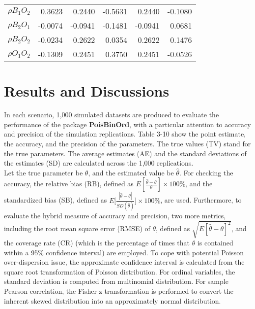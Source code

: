 \documentclass[letterpaper]{article}
\begin{document}
\begin{table}[h]
\begin{tabular}{crrrrr}
$\rho{B_1O_2}$ & 0.3623                  & 0.2440                  & -0.5631                  & 0.2440                    & -0.1080                                    \\
$\rho{B_2O_1}$ & -0.0074                 & -0.0941                 & -0.1481                  & -0.0941                   & 0.0681                                     \\
$\rho{B_2O_2}$ & -0.0234                 & 0.2622                  & 0.0354                   & 0.2622                    & 0.1476                                     \\
$\rho{O_1O_2}$ & -0.1309                 & 0.2451                  & 0.3750                   & 0.2451                    & -0.0526                                    \\ \hline
\end{tabular}
\end{table}

\newpage
\section{Results and Discussions}

In each scenario, 1,000 simulated datasets are produced to evaluate the performance of the package \textbf{PoisBinOrd}, with a particular attention to accuracy and precision of the simulation replications. Table 3-10 show the point estimate, the accuracy, and the precision of the parameters. The true values (TV) stand for the true parameters. The average estimates (AE) and the standard deviations of the estimates (SD) are calculated across the 1,000 replications.\\

Let the true parameter be $\theta$, and the estimated value be $\hat\theta$. For checking the accuracy, the relative bias (RB), defined as $E[\frac{\hat\theta-\theta}{\theta}]\times100\%$, and the standardized bias (SB), defined as $E\bigg[\frac{|\hat\theta-\theta|}{SD(\hat\theta)}\bigg]\times100\%$, are used. Furthermore, to evaluate the hybrid measure of accuracy and precision, two more metrics, including the root mean square error (RMSE) of $\theta$, defined as $\sqrt{E[\hat\theta-\theta]^2}$, and the coverage rate (CR) (which is the percentage of times that $\theta$ is contained within a 95\% confidence interval) are employed. To cope with potential Poisson over-dispersion issue, the approximate confidence interval is calculated from the square root transformation of Poisson distribution. For ordinal variables, the standard deviation is computed from multinomial distribution. For sample Pearson correlation, the Fisher z-transformation is performed to convert the inherent skewed distribution into an approximately normal distribution.\\
\end{document}
